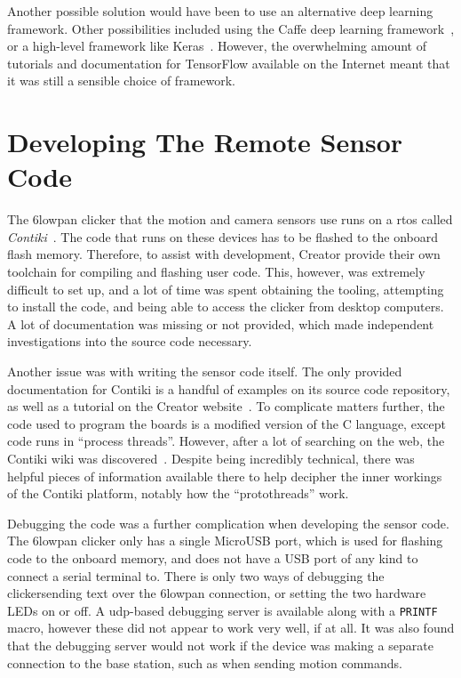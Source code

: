 Another possible solution would have been to use an alternative deep learning
framework. Other possibilities included using the Caffe deep learning
framework~\cite{jia2014caffe}, or a high-level framework like
Keras~\cite{keras}. However, the overwhelming amount of tutorials and
documentation for TensorFlow available on the Internet meant that it was
still a sensible choice of framework.

\section{Developing The Remote Sensor Code}
The \gls{6lowpan} clicker that the motion and camera sensors use runs on a
\acrfull{rtos} called \textit{Contiki}~\cite{contiki}. The code that runs on
these devices has to be flashed to the onboard flash memory. Therefore, to
assist with development, Creator provide their own toolchain for compiling
and flashing user code. This, however, was extremely difficult to set up, and
a lot of time was spent obtaining the tooling, attempting to install the
code, and being able to access the clicker from desktop computers. A lot of
documentation was missing or not provided, which made independent
investigations into the source code necessary.

Another issue was with writing the sensor code itself. The only provided
documentation for Contiki is a handful of examples on its source code
repository, as well as a tutorial on the Creator
website~\cite{clickersetupguide}. To complicate matters further, the code
used to program the boards is a modified version of the C language, except
code runs in ``process threads''. However, after a lot of searching on the
web, the Contiki wiki was discovered~\cite{contiki-wiki}. Despite being
incredibly technical, there was helpful pieces of information available there
to help decipher the inner workings of the Contiki platform, notably how the
``protothreads'' work.

Debugging the code was a further complication when developing the sensor
code. The \gls{6lowpan} clicker only has a single MicroUSB port, which is
used for flashing code to the onboard memory, and does not have a USB port of
any kind to connect a serial terminal to. There is only two ways of debugging
the clicker\textemdash{}sending text over the \gls{6lowpan} connection, or
setting the two hardware LEDs on or off. A \acrshort{udp}-based debugging
server is available along with a \texttt{PRINTF} macro, however these did not
appear to work very well, if at all. It was also found that the debugging
server would not work if the device was making a separate connection to the
base station, such as when sending motion commands.

